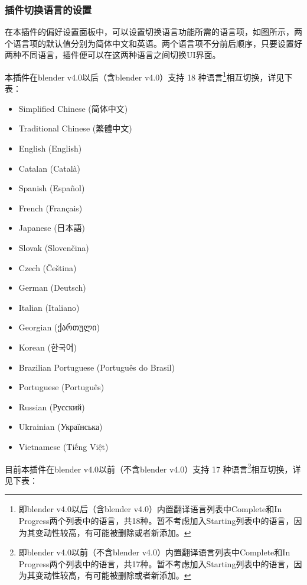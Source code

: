 \documentclass{../../public_resources/doc}
\begin{document}
\subsubsection{插件切换语言的设置}
在本插件的偏好设置面板中，可以设置切换语言功能所需的语言项，如图所示，两个语言项的默认值分别为简体中文和英语。两个语言项不分前后顺序，只要设置好两种不同语言，插件便可以在这两种语言之间切换UI界面。

本插件在blender v4.0以后（含blender v4.0）支持 18 种语言\footnote{即blender v4.0以后（含blender v4.0）内置翻译语言列表中Complete和In Progress两个列表中的语言，共18种。暂不考虑加入Starting列表中的语言，因为其变动性较高，有可能被删除或者新添加。}相互切换，详见下表：

\begin{itemize}
    \item Simplified Chinese (简体中文)
    \item Traditional Chinese (繁體中文)
    \item English (English)
    \item Catalan (Català)
    \item Spanish (Español)
    \item French (Français)
    \item Japanese (日本語)
    \item Slovak (Slovenčina)
    \item Czech (Čeština)
    \item German (Deutsch)
    \item Italian (Italiano)
    \item Georgian (ქართული)
    \item Korean (한국어)
    \item Brazilian Portuguese (Português do Brasil)
    \item Portuguese (Português)
    \item Russian (Русский)
    \item Ukrainian (Українська)
    \item Vietnamese (Tiếng Việt)
\end{itemize}

目前本插件在blender v4.0以前（不含blender v4.0）支持 17 种语言\footnote{即blender v4.0以前（不含blender v4.0）内置翻译语言列表中Complete和In Progress两个列表中的语言，共17种。暂不考虑加入Starting列表中的语言，因为其变动性较高，有可能被删除或者新添加。}相互切换，详见下表：
\end{document}
